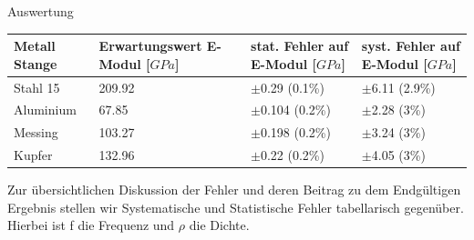 \documentclass[twoside]{protokoll}
\begin{document}
\begin{aufgabe}{Auswertung}
 \begin{table}[H]
        \centering
        \begin{tabularx}{1\textwidth}{X X X X} %
            \toprule
            \textbf{Metall Stange} & \textbf{Erwartungswert E-Modul [$GPa$]} & \textbf{stat. Fehler auf E-Modul [$GPa$]} & \textbf{syst. Fehler auf E-Modul [$GPa$]}\\
            \midrule
            Stahl 15 & 209.92 & $\pm$0.29  (0.1\%) & $\pm$6.11 (2.9\%) \\
            Aluminium & 67.85 & $\pm$0.104 (0.2\%) & $\pm$2.28 (3\%) \\
            Messing & 103.27  & $\pm$0.198 (0.2\%) & $\pm$3.24 (3\%) \\
            Kupfer & 132.96   & $\pm$0.22  (0.2\%) & $\pm$4.05 (3\%) \\
            \bottomrule
        \end{tabularx}
        \label{tab:mytable}
    \end{table}

Zur übersichtlichen Diskussion der Fehler und deren Beitrag zu dem Endgültigen Ergebnis stellen wir Systematische und Statistische Fehler tabellarisch gegenüber.
Hierbei ist f die Frequenz und $\rho$ die Dichte.


\end{aufgabe}
\end{document}
